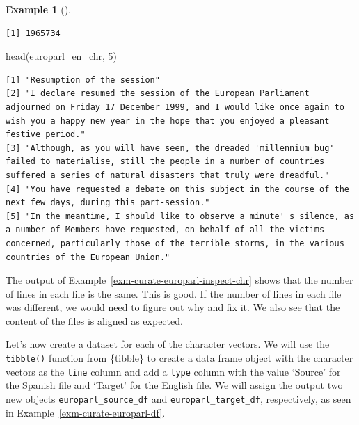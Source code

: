 \documentclass[
  letterpaper,
]{latex/krantz}
\newenvironment{Shaded}{\begin{snugshade}}{\end{snugshade}}
\newcommand{\DecValTok}[1]{\textcolor[rgb]{0.00,0.00,0.00}{#1}}
\newcommand{\FunctionTok}[1]{\textcolor[rgb]{0.00,0.00,0.00}{#1}}
\newcommand{\NormalTok}[1]{\textcolor[rgb]{0.00,0.00,0.00}{#1}}
\theoremstyle{definition}
\newtheorem{example}{Example}[chapter]
\theoremstyle{remark}
\begin{document}
\begin{example}[]
\begin{verbatim}
[1] 1965734
\end{verbatim}

\begin{Shaded}
\begin{Highlighting}[]
\FunctionTok{head}\NormalTok{(europarl\_en\_chr, }\DecValTok{5}\NormalTok{)}
\end{Highlighting}
\end{Shaded}

\begin{verbatim}
[1] "Resumption of the session"                                                                                                                                                                                                               
[2] "I declare resumed the session of the European Parliament adjourned on Friday 17 December 1999, and I would like once again to wish you a happy new year in the hope that you enjoyed a pleasant festive period."                         
[3] "Although, as you will have seen, the dreaded 'millennium bug' failed to materialise, still the people in a number of countries suffered a series of natural disasters that truly were dreadful."                                         
[4] "You have requested a debate on this subject in the course of the next few days, during this part-session."                                                                                                                               
[5] "In the meantime, I should like to observe a minute' s silence, as a number of Members have requested, on behalf of all the victims concerned, particularly those of the terrible storms, in the various countries of the European Union."
\end{verbatim}

\end{example}

The output of Example~\ref{exm-curate-europarl-inspect-chr} shows that
the number of lines in each file is the same. This is good. If the
number of lines in each file was different, we would need to figure out
why and fix it. We also see that the content of the files is aligned as
expected.

Let's now create a dataset for each of the character vectors. We will
use the \texttt{tibble()} function from \{tibble\} to create a data
frame object with the character vectors as the \texttt{line} column and
add a \texttt{type} column with the value `Source' for the Spanish file
and `Target' for the English file. We will assign the output two new
objects \texttt{europarl\_source\_df} and \texttt{europarl\_target\_df},
respectively, as seen in Example~\ref{exm-curate-europarl-df}.
\end{document}
